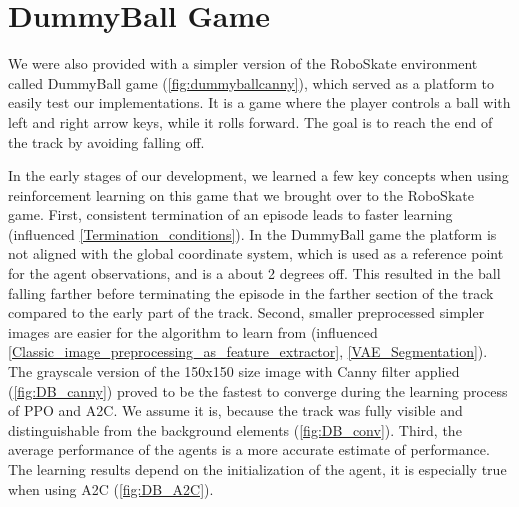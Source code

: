 \documentclass[conference]{IEEEtran}
\begin{document}

\section{DummyBall Game}
We were also provided with a simpler version of the RoboSkate environment called DummyBall game (\figurename  \ref{fig:dummyballcanny}), which served as a platform to easily test our implementations. It is a game where the player controls a ball with left and right arrow keys, while it rolls forward. The goal is to reach the end of the track by avoiding falling off. 

In the early stages of our development, we learned a few key concepts when using reinforcement learning on this game that we brought over to the RoboSkate game. First, consistent termination of an episode leads to faster learning (influenced \ref{Termination_conditions}). In the DummyBall game the platform is not aligned with the global coordinate system, which is used as a reference point for the agent observations, and is a about 2 degrees off. This resulted in the ball falling farther before terminating the episode in the farther section of the track compared to the early part of the track. Second, smaller preprocessed simpler images are easier for the algorithm to learn from (influenced \ref{Classic_image_preprocessing_as_feature_extractor}, \ref{VAE_Segmentation}). The grayscale version of the 150x150 size image with Canny filter applied (\figurename  \ref{fig:DB_canny}) proved to be the fastest to converge during the learning process of PPO and A2C. We assume it is, because the track was fully visible and distinguishable from the background elements (\figurename  \ref{fig:DB_conv}). Third, the average performance of the agents is a more accurate estimate of performance. The learning results depend on the initialization of the agent, it is especially true when using A2C (\figurename  \ref{fig:DB_A2C}). 

\end{document}
